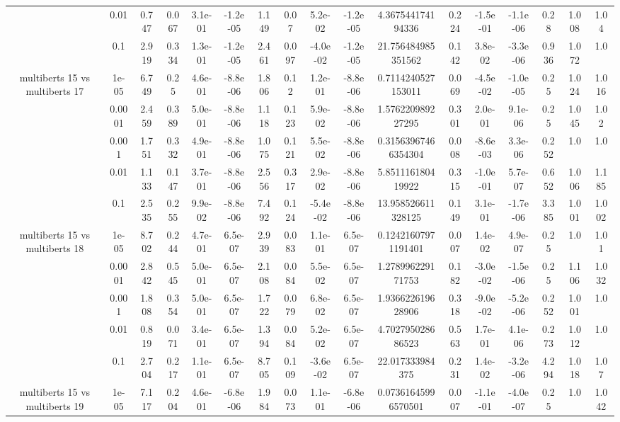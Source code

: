 \begin{tabular}{|c|c|c|c|c|c|c|c|c|c|c|c|c|c|c|c|c|}
 & 0.01 & 0.747 & 0.067 & 3.1e-01 & -1.2e-05 & 1.149 & 0.07 & 5.2e-02 & -1.2e-05 & 4.367544174194336 & 0.224 & -1.5e-01 & -1.1e-06 & 0.28 & 1.008 & 1.04 \\
 & 0.1 & 2.919 & 0.334 & 1.3e-01 & -1.2e-05 & 2.461 & 0.097 & -4.0e-02 & -1.2e-05 & 21.756484985351562 & 0.142 & 3.8e-02 & -3.3e-06 & 0.936 & 1.072 & 1.0 \\
\hline
\multirow{5}{*}{multiberts 15 vs multiberts 17} & 1e-05 & 6.749 & 0.25 & 4.6e-01 & -8.8e-06 & 1.806 & 0.12 & 1.2e-01 & -8.8e-06 & 0.7114240527153011 & 0.069 & -4.5e-02 & -1.0e-05 & 0.25 & 1.024 & 1.016 \\
 & 0.0001 & 2.459 & 0.389 & 5.0e-01 & -8.8e-06 & 1.118 & 0.123 & 5.9e-02 & -8.8e-06 & 1.576220989227295 & 0.301 & 2.0e-01 & 9.1e-06 & 0.25 & 1.045 & 1.02 \\
 & 0.001 & 1.751 & 0.332 & 4.9e-01 & -8.8e-06 & 1.075 & 0.121 & 5.5e-02 & -8.8e-06 & 0.31563967466354304 & 0.008 & -8.6e-03 & 3.3e-06 & 0.252 & 1.0 & 1.0 \\
 & 0.01 & 1.133 & 0.147 & 3.7e-01 & -8.8e-06 & 2.556 & 0.317 & 2.9e-02 & -8.8e-06 & 5.851116180419922 & 0.315 & -1.0e-01 & 5.7e-07 & 0.652 & 1.006 & 1.185 \\
 & 0.1 & 2.535 & 0.255 & 9.9e-02 & -8.8e-06 & 7.492 & 0.124 & -5.4e-02 & -8.8e-06 & 13.958526611328125 & 0.149 & 3.1e-01 & -1.7e-06 & 3.385 & 1.001 & 1.002 \\
\hline
\multirow{5}{*}{multiberts 15 vs multiberts 18} & 1e-05 & 8.702 & 0.244 & 4.7e-01 & 6.5e-07 & 2.939 & 0.083 & 1.1e-01 & 6.5e-07 & 0.12421607971191401 & 0.007 & 1.4e-02 & 4.9e-07 & 0.25 & 1.0 & 1.01 \\
 & 0.0001 & 2.842 & 0.545 & 5.0e-01 & 6.5e-07 & 2.108 & 0.084 & 5.5e-02 & 6.5e-07 & 1.278996229171753 & 0.182 & -3.0e-02 & -1.5e-06 & 0.25 & 1.106 & 1.032 \\
 & 0.001 & 1.808 & 0.354 & 5.0e-01 & 6.5e-07 & 1.722 & 0.079 & 6.8e-02 & 6.5e-07 & 1.936622619628906 & 0.318 & -9.0e-02 & -5.2e-06 & 0.252 & 1.001 & 1.0 \\
 & 0.01 & 0.819 & 0.071 & 3.4e-01 & 6.5e-07 & 1.394 & 0.084 & 5.2e-02 & 6.5e-07 & 4.702795028686523 & 0.563 & 1.7e-01 & 4.1e-06 & 0.273 & 1.012 & 1.0 \\
 & 0.1 & 2.704 & 0.217 & 1.1e-01 & 6.5e-07 & 8.705 & 0.109 & -3.6e-02 & 6.5e-07 & 22.017333984375 & 0.231 & 1.4e-02 & -3.2e-06 & 4.294 & 1.018 & 1.07 \\
\hline
\multirow{5}{*}{multiberts 15 vs multiberts 19} & 1e-05 & 7.117 & 0.204 & 4.6e-01 & -6.8e-06 & 1.984 & 0.073 & 1.1e-01 & -6.8e-06 & 0.07361645996570501 & 0.007 & -1.1e-01 & -4.0e-07 & 0.25 & 1.0 & 1.042 \\

\end{tabular}
